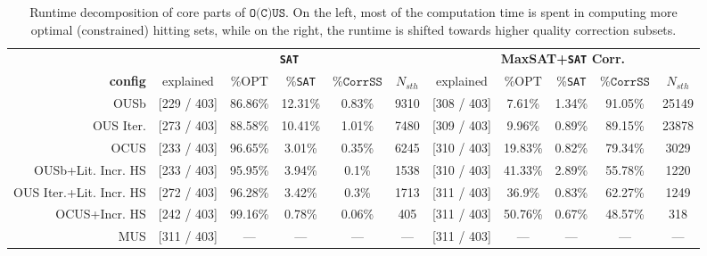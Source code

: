 \documentclass[a4paper,UKenglish,cleveref, autoref, thm-restate, pdfa]{lipics-v2021}
\newcommand\mm[1]{\ensuremath{#1}\xspace}
\newcommand\call[1]{\mm{\texttt{#1}}}
\newcommand\sat{\texttt{{SAT}}\xspace}
\newcommand\corrss{\mm{\call{CorrSS}}}
\newcommand\maxsat{MaxSAT\xspace}
\begin{document}
		
		\begin{table}[!h]
			\centering
				\begin{tabular}{r|c|c|c|c|c|c|c|c|c|c}
					& \multicolumn{5}{c|}{\textbf{\sat}} & \multicolumn{5}{c}{\textbf{\maxsat+\sat Corr.}}\\[1ex]
					\textbf{config}         &  explained  &  \%\textsc{OPT} &   \%\sat & \%\corrss &  $N_{sth}$ & explained  &  \%\textsc{OPT} &   \%\sat & \%\corrss &  $N_{sth}$  \\ \hline
					OUSb                    & [229 / 403] &          86.86\% & 12.31\% & 0.83\% &      9310 & [308 / 403] &          7.61\% &   1.34\% &    91.05\% &     25149 \\
					OUS Iter.               & [273 / 403] &          88.58\% & 10.41\% & 1.01\% &      7480 & [309 / 403] &          9.96\% &   0.89\% &    89.15\% &     23878  \\
					OCUS                    & [233 / 403] &          96.65\% &  3.01\% & 0.35\% &      6245 & [310 / 403] &         19.83\% &   0.82\% &    79.34\% &      3029  \\
					OUSb+Lit. Incr. HS      & [233 / 403] &          95.95\% &  3.94\% &  0.1\% &      1538 & [310 / 403] &         41.33\% &   2.89\% &    55.78\% &      1220  \\
					OUS Iter.+Lit. Incr. HS & [272 / 403] &          96.28\% &  3.42\% &  0.3\% &      1713 & [311 / 403] &          36.9\% &   0.83\% &    62.27\% &      1249  \\
					OCUS+Incr. HS           & [242 / 403] &          99.16\% &  0.78\% & 0.06\% &       405 & [311 / 403] &         50.76\% &   0.67\% &    48.57\% &       318 \\
					MUS                     & [311 / 403] &              --- &     --- &    --- &       --- & [311 / 403] &             --- &       ---&          ---&        --- \\
				\end{tabular}
			\caption{Runtime decomposition of core parts of \call{O(C)US}. On the left, most of the computation time is spent in computing more optimal (constrained) hitting sets, while on the right, the runtime is shifted towards higher quality correction subsets.}
			\label{tab:runtime-decomposition}
		\end{table}
		
\end{document}
